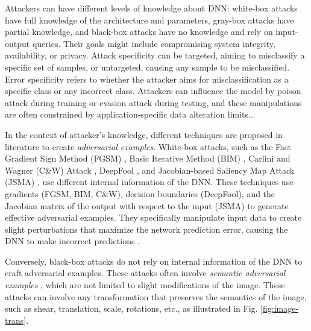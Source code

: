 Attackers can have different levels of knowledge about DNN: white-box attacks have full knowledge of the architecture and parameters, gray-box attacks have partial knowledge, and black-box attacks have no knowledge and rely on input-output queries. Their goals might include compromising system integrity, availability, or privacy. Attack specificity can be targeted, aiming to misclassify a specific set of samples, or untargeted, causing any sample to be misclassified. 
Error specificity refers to whether the attacker aims for misclassification as a specific class or any incorrect class. Attackers can influence the model by poison attack \cite{poisonattack,Badnets} during training or evasion attack \cite{evasion} during testing, and these manipulations are often constrained by application-specific data alteration limits.\cite{Chakraborty}.

In the context of attacker's knowledge, different techniques are proposed in literature to create \emph{adversarial examples}. White-box attacks, such as the Fast Gradient Sign Method (FGSM) \cite{FGSM}, Basic Iterative Method (BIM) \cite{BIM}, Carlini and Wagner (C\&W) Attack \cite{Carlini}, DeepFool \cite{deepfool}, and Jacobian-based Saliency Map Attack (JSMA) \cite{JSMA}, use different internal information of the DNN. These techniques use gradients (FGSM, BIM, C\&W), decision boundaries (DeepFool), and the Jacobian matrix of the output with respect to the input (JSMA) to generate effective adversarial examples. They specifically manipulate input data to create slight perturbations that maximize the network prediction error, causing the DNN to make incorrect predictions \cite{Hosseini}.

Conversely, black-box attacks do not rely on internal information of the DNN to craft adversarial examples. These attacks often involve \emph{semantic adversarial examples} \cite{HuangX,deeptest,Engstrom,Pei}, which are not limited to slight modifications of the image. These attacks can involve any transformation that preserves the semantics of the image, such as shear, translation, scale, rotations, etc., as illustrated in Fig. \ref{fig:image-trans}.






\begin{center}
  \end{center}

